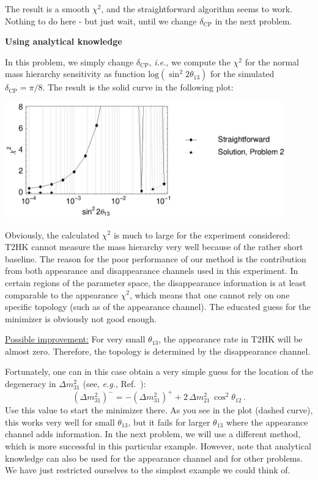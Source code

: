 \documentclass[12pt,a4paper]{article}
\newcommand{\aufg}[1]{\vspace{4mm}{\bf\underline{Problem #1:}}\vspace{3mm}}
\begin{document}
The result is a smooth $\chi^2$, and the straightforward algorithm seems to work. Nothing to do here - but just wait, until we change $\delta_\mathrm{CP}$ in the next problem.

\aufg{2} {\bf Using analytical knowledge}

In this problem, we simply change $\delta_{\mathrm{CP}}$, {\it i.e.}, we compute the $\chi^2$ for the normal mass hierarchy sensitivity as function $\mathrm{log}( \sin^2 2 \theta_{13})$ for the simulated $\delta_{\mathrm{CP}}=\pi/8$. The result is the solid curve in the following plot:

\begin{center}
\includegraphics[height=5cm]{problem2}
\end{center}

Obviously, the calculated $\chi^2$ is much to large for the experiment considered: T2HK cannot measure the mass hierarchy very well because of the rather short baseline. The reason for the poor performance of our method is the contribution from both appearance and disappearance channels used in this experiment. In certain regions of the parameter space, the disappearance information is at least comparable to the appearance $\chi^2$, which means that one cannot rely on one specific topology (such as of the appearance channel). The educated guess for the minimizer is obviously not good enough.

\vspace*{3mm}

\underline{Possible improvement:}
 For very small $\theta_{13}$, the appearance rate in T2HK will be almost zero. Therefore, the topology is determined by the disappearance channel. 

Fortunately, one can in this case obtain a very simple guess for the location of the degeneracy in $\Delta m_{31}^2$ (see, {\it e.g.}, Ref.~\cite{deGouvea:2005mi}):
\begin{equation}
(\Delta m_{31}^2)^- = - (\Delta m_{31}^2)^+ + 2 \, \Delta m_{21}^2 \, \cos^2 \theta_{12} \, .
\end{equation}
Use this value to start the minimizer there. As you see in the plot (dashed curve), this works very well for small $\theta_{13}$, but it fails for larger $\theta_{13}$ where the appearance channel adds information. In the next
problem, we will use a different method, which is more successful in this particular example. However, note that analytical knowledge can also be used for the appearance channel and for other problems. We have just restricted ourselves to the simplest example we could think of.
\end{document}
